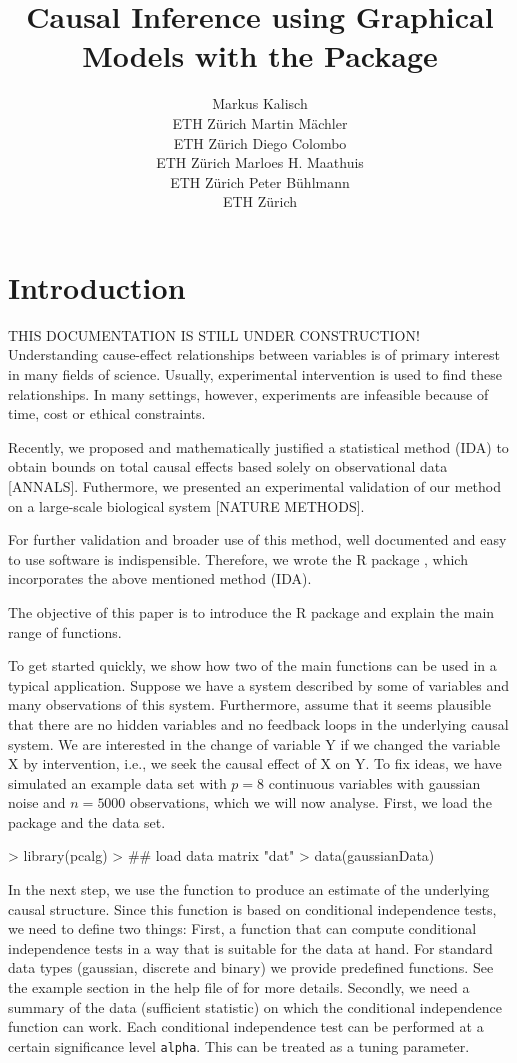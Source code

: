 \documentclass[article]{jss}
\author{Markus Kalisch\\ETH Z\"urich \And
        Martin M\"achler\\ETH Z\"urich \And
      Diego Colombo\\ETH Z\"urich \And
    Marloes H. Maathuis\\ETH Z\"urich \And
  Peter B\"uhlmann\\ETH Z\"urich}
\title{Causal Inference using Graphical Models with the Package \pkg{pcalg}}
\begin{document}

\section{Introduction}
THIS DOCUMENTATION IS STILL UNDER CONSTRUCTION! \\

Understanding cause-effect relationships between variables is of primary
interest in many fields of science. Usually, experimental intervention is
used to find these relationships. In many settings, however, experiments
are infeasible because of time, cost or ethical constraints.

Recently, we proposed and mathematically justified a statistical
method (IDA) to obtain bounds on total causal effects based solely on
observational data [ANNALS]. Futhermore, we presented an experimental
validation of our method on a large-scale biological system [NATURE METHODS].

For further validation and broader use of this method, well documented and
easy to use software is indispensible. Therefore, we wrote the R package
, which incorporates the above mentioned method (IDA).

The objective of this paper is to introduce the R package  and
explain the main range of functions.

To get started quickly, we show how two of the main functions can be used
in a typical application. Suppose we have a system described by some of variables
and many observations of this system. Furthermore, assume that it seems plausible that
there are no hidden variables and no feedback loops in the underlying
causal system. We are interested in the change of variable Y if we changed
the variable X by intervention, i.e., we seek the causal effect of X on Y.
To fix ideas, we have simulated an example data set with $p = 8$ continuous
variables with gaussian noise and $n = 5000$ observations, which we will
now analyse. First, we load the package  and the data set.

\begin{Schunk}
\begin{Sinput}
>  library(pcalg)
>  ## load data matrix "dat"
>  data(gaussianData)
\end{Sinput}
\end{Schunk}

In the next step, we use the function  to produce an estimate of
the underlying causal structure. Since this function is based on
conditional independence tests, we need to define two things: First, a
function that can compute conditional independence tests in a way that is
suitable for the data at hand. For standard data types (gaussian, discrete
and binary) we provide predefined functions. See the example section in the
help file of  for more details. Secondly, we need a summary of the
data (sufficient statistic) on which the conditional independence function
can work. Each conditional independence test can be performed at a certain
significance level \texttt{alpha}. This can be treated as a tuning
parameter.
\end{document}
